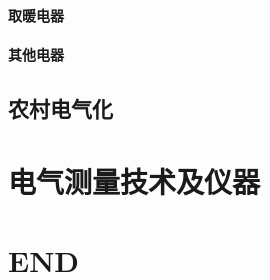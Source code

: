 \documentclass[UTF8]{../../ApplicationUniverse}
\begin{document}
    \subsubsection{取暖电器}
    \subsubsection{其他电器}
\section{农村电气化}

\chapter{电气测量技术及仪器}








\chapter{END}
\end{document}
